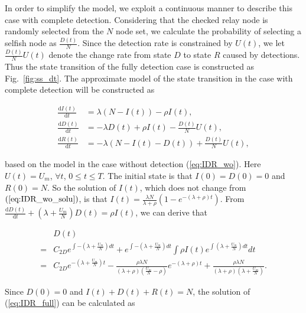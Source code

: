 In order to simplify the model,
we exploit a continuous manner to
describe this case with complete detection.
Considering that the checked relay node
is randomly selected from the $N$ node set,
we calculate the probability of selecting a selfish node
as $\frac{D(t)}{N}$.
Since the detection rate is constrained by $U(t)$,
we let $\frac{D(t)}{N}U(t)$ denote
the change rate from state $D$ to state $R$ caused by detections.
Thus the state transition of the fully detection case
is constructed as Fig.~\ref{fig:ss_dt}.
The approximate model of the state transition in the case with complete detection
will be constructed as
\begin{small}
\begin{equation}
\label{eq:IDR_full}
\begin{aligned}
\frac{\mathrm{d} I(t)}{\mathrm{d} t} &=  \lambda (N-I(t)) - \rho I(t),\\
\frac{\mathrm{d} D(t)}{\mathrm{d} t} &= - \lambda D(t) + \rho I(t) - \frac{D(t)}{N} U(t),\\
\frac{\mathrm{d} R(t)}{\mathrm{d} t} &= - \lambda (N-I(t)-D(t)) + \frac{D(t)}{N} U(t),
\end{aligned}
\end{equation}
\end{small}
based on the model in the case without detection (\ref{eq:IDR_wo}).
Here $U(t) = U_{m}$, $\forall t$, $0 \le t \le T$.
The initial state is that $I(0)=D(0)=0$ and $R(0)=N$.
So the solution of $I(t)$, which does not change from $(\ref{eq:IDR_wo_solu})$,
is that $I(t) = \frac{ \lambda N }{ \lambda + \rho }(1- e^{-(\lambda + \rho)t})$.
From $\frac{\mathrm{d} D(t)}{\mathrm{d} t} + (\lambda + \frac{U_{m}}{N}) D(t)= \rho I(t)$,
we can derive that
\begin{small}
\begin{equation}
\nonumber
\begin{aligned}
& D(t) \\
=& C_{2D} e^{\int -(\lambda + \frac{U_{m}}{N}) dt}
+ e^{\int -(\lambda + \frac{U_{m}}{N}) dt} \int \rho I(t) e^{\int (\lambda + \frac{U_{m}}{N}) dt} dt \\
=& C_{2D} e^{-(\lambda + \frac{U_{m}}{N})t}
- \frac{ \rho \lambda N }{ (\lambda + \rho)(\frac{U_{m}}{N} - \rho) } e^{-(\lambda + \rho)t}
+ \frac{ \rho \lambda N }{ (\lambda + \rho)(\lambda + \frac{U_{m}}{N}) }.
\end{aligned}
\end{equation}
\end{small}
Since $D(0) = 0$ and $I(t) + D(t) + R(t) = N$,
the solution of (\ref{eq:IDR_full}) can be calculated as
